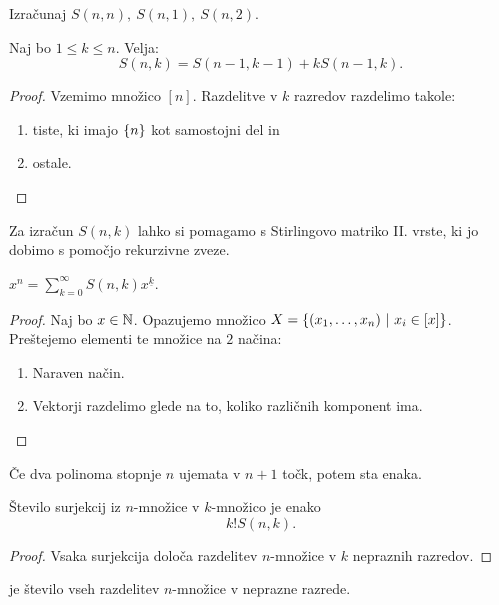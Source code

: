 \begin{primer}
    Izračunaj $S(n, n), \ S(n, 1), \ S(n,2)$.
\end{primer}

\begin{trditev}
    Naj bo $1 \leq k \leq n$. Velja:
    $$S(n,k) = S(n-1, k-1) + k S(n-1, k).$$
\end{trditev}

\begin{proof}
    Vzemimo množico $[n]$. Razdelitve v $k$ razredov razdelimo takole:
    \begin{enumerate}
        \item tiste, ki imajo $\left\{n\right\}$ kot samostojni del in
        \item ostale. \qedhere
    \end{enumerate}
\end{proof}

Za izračun $S(n,k)$ lahko si pomagamo s Stirlingovo matriko II. vrste, ki jo dobimo s pomočjo rekurzivne zveze.

\begin{trditev}
    $x^n=\sum_{k=0}^{\infty} S(n,k) x^{\underline{k}}$.
\end{trditev}

\begin{proof}
    Naj bo \(x \in \mathbb{N}\). Opazujemo množico \(X = \left\{(x_1, \ldots, x_n) \ | \ x_i \in [x]\right\}\). Preštejemo elementi te množice na \(2\) načina:
    \begin{enumerate}
        \item Naraven način.
        \item Vektorji razdelimo glede na to, koliko različnih komponent ima. \qedhere
    \end{enumerate}
\end{proof}

\begin{opomba}
    Če dva polinoma stopnje $n$ ujemata v $n+1$ točk, potem sta enaka.
\end{opomba}

\begin{izrek}
    Število surjekcij iz $n$-množice v $k$-množico je enako 
    $$k! S(n,k).$$
\end{izrek}

\begin{proof}
    Vsaka surjekcija določa razdelitev $n$-množice v $k$ nepraznih razredov.
\end{proof}

\begin{definicija}
     je število vseh razdelitev $n$-množice v neprazne razrede.
\end{definicija}

